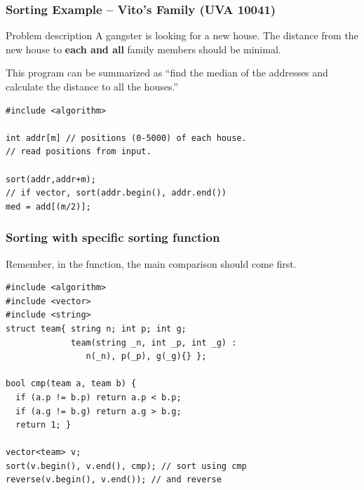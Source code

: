 \documentclass{beamer}
\begin{document}
\begin{frame}[fragile]
  \frametitle{Sorting Example -- Vito's Family (UVA 10041)}
  
  \begin{exampleblock}{Problem description}
    A gangster is looking for a new house. The distance from the new
    house to {\bf each and all} family members should be minimal.
  \end{exampleblock}

  \medskip

  This program can be summarized as ``find the median of the addresses
  and calculate the distance to all the houses.''

  \medskip

  \begin{block}{}
    {\small
\begin{verbatim}
#include <algorithm>

int addr[m] // positions (0-5000) of each house.
// read positions from input.

sort(addr,addr+m); 
// if vector, sort(addr.begin(), addr.end())
med = add[(m/2)];
\end{verbatim}}
  \end{block}
\end{frame}

\begin{frame}[fragile]
  \frametitle{Sorting with specific sorting function}
  \begin{block}{}
    Remember, in the function, the main comparison should come first.
  \end{block}

  {\small
\begin{verbatim}
#include <algorithm>
#include <vector>
#include <string>
struct team{ string n; int p; int g; 
             team(string _n, int _p, int _g) : 
                n(_n), p(_p), g(_g){} };

bool cmp(team a, team b) {
  if (a.p != b.p) return a.p < b.p;
  if (a.g != b.g) return a.g > b.g;
  return 1; }

vector<team> v;
sort(v.begin(), v.end(), cmp); // sort using cmp
reverse(v.begin(), v.end()); // and reverse
\end{verbatim}}
\end{frame}
\end{document}
